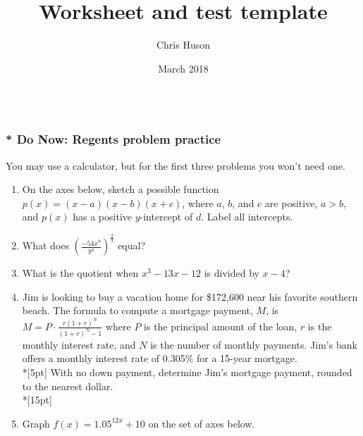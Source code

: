 \documentclass[12pt, oneside]{article}
\title{Worksheet and test template}
\author{Chris Huson}
\date{March 2018}
\begin{document}
\subsubsection*{\\* Do Now: Regents problem practice}
You may use a calculator, but for the first three problems you won't need one.

\begin{enumerate}

\item On the axes below, sketch a possible function $p(x) = (x  -a)(x - b)(x + c)$, where $a$, $b$, and $c$ are positive, $a  >b$, and $p(x)$ has a positive $y$-intercept of $d$. Label all intercepts. 
\begin{center}
\end{center} %

\item What does $\displaystyle \left( \frac{-54x^9}{y^4} \right)^\frac{2}{3}$ equal? %

\newpage

\item What is the quotient when $x^3-13x-12$ is divided by $x - 4$?\\[220pt]

\item Jim is looking to buy a vacation home for \$172,600 near his favorite southern beach. The formula to compute a mortgage payment, $M$, is $\displaystyle M=P \cdot \frac{r(1+r)^N}{(1+r)^N-1}$ where $P$ is the principal amount of the loan, $r$ is the monthly interest rate, and $N$ is the number of monthly payments. Jim’s bank offers a monthly interest rate of 0.305\% for a 15-year mortgage.\\*[5pt]
With no down payment, determine Jim’s mortgage payment, rounded to the nearest dollar.\\*[15pt]

\newpage

\item Graph $\displaystyle f(x)= 1.05^{12x} +10$ on the set of axes below.
\begin{center}
\end{center} %


\end{enumerate}
\end{document}
